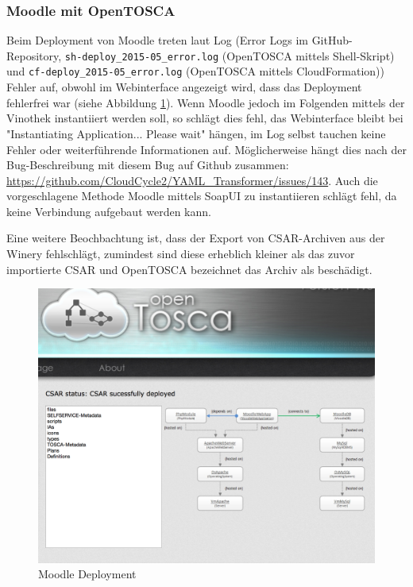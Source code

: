 \subsubsection{Moodle mit OpenTOSCA}
Beim Deployment von Moodle treten laut Log (Error Logs im GitHub-Repository, \verb|sh-deploy_2015-05_error.log| (OpenTOSCA mittels Shell-Skript) und \verb|cf-deploy_2015-05_error.log| (OpenTOSCA mittels CloudFormation)) Fehler auf, obwohl im Webinterface angezeigt wird, dass das Deployment fehlerfrei war (siehe Abbildung \ref{fig:moodle_deployment}). Wenn Moodle jedoch im Folgenden mittels der Vinothek instantiiert werden soll, so schlägt dies fehl, das Webinterface bleibt bei "Instantiating Application... Please wait" hängen, im Log selbst tauchen keine Fehler oder weiterführende Informationen auf. Möglicherweise hängt dies nach der Bug-Beschreibung mit diesem Bug auf Github zusammen: \url{https://github.com/CloudCycle2/YAML_Transformer/issues/143}. Auch die vorgeschlagene Methode Moodle mittels SoapUI zu instantiieren schlägt fehl, da keine Verbindung aufgebaut werden kann. 

Eine weitere Beochbachtung ist, dass der Export von CSAR-Archiven aus der Winery fehlschlägt, zumindest sind diese erheblich kleiner als das zuvor importierte CSAR und OpenTOSCA bezeichnet das Archiv als beschädigt.
\begin{figure}
\centering
\includegraphics[width=\textwidth]{3/moodle_success}
\caption{Moodle Deployment}
\label{fig:moodle_deployment}
\end{figure}